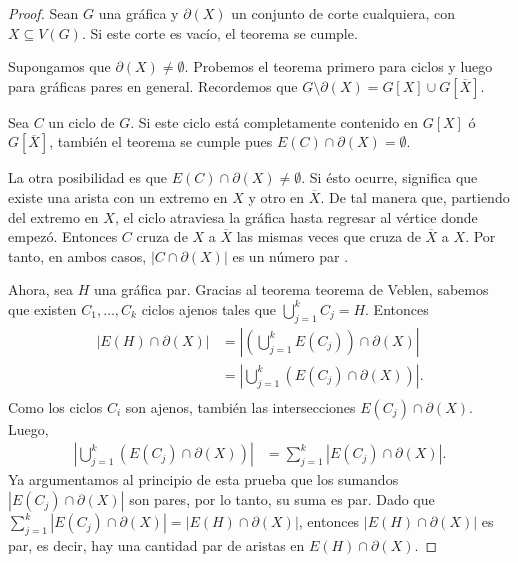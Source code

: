 \begin{proof} Sean $G$ una gráfica y $\partial(X)$ un conjunto de corte cualquiera, con $X \subseteq V(G)$. Si este corte es vacío, el teorema se cumple. 

Supongamos que $\partial(X) \neq \emptyset$. Probemos el teorema primero para ciclos y luego para gráficas pares en general. Recordemos que $G\setminus \partial(X) = G[X] \cup G[\overline{X}]$.

Sea $C$ un ciclo de $G$. Si este ciclo está completamente contenido en $G[X]$ ó $G[\overline{X}]$, también el teorema se cumple pues $E(C) \cap \partial(X) = \emptyset$.

La otra posibilidad es que $E(C) \cap \partial(X) \neq \emptyset$. Si ésto ocurre, significa que existe una arista con un extremo en $X$ y otro en $\overline{X}$. De tal manera que, partiendo del extremo en $X$, el ciclo atraviesa la gráfica hasta regresar al vértice donde empezó. Entonces $C$ cruza de $X$ a $\overline{X}$ las mismas veces que cruza de $\overline{X}$ a $X$. Por tanto, en ambos casos, $|C \cap \partial(X)|$ es un número par .

Ahora, sea $H$ una gráfica par. Gracias al teorema teorema de Veblen, sabemos que existen $C_{1},\ldots, C_{k}$ ciclos ajenos tales que $\bigcup_{j=1}^{k}C_{j} = H$. Entonces  
\begin{align*}
    |E(H) \cap \partial(X)| &= |(\bigcup_{j=1}^{k}E(C_{j})) \cap \partial(X)|\\
                      &= |\bigcup_{j=1}^{k} (E(C_{j}) \cap \partial(X))|.\\
\end{align*}
Como los ciclos $C_{i}$ son ajenos, también las intersecciones $E(C_{j}) \cap \partial(X)$. Luego, 
\begin{align*}
    |\bigcup_{j=1}^{k} (E(C_{j}) \cap \partial(X))| &= \sum_{j=1}^{k} |E(C_{j}) \cap \partial(X)|.
\end{align*}
Ya argumentamos al principio de esta prueba que los sumandos $|E(C_{j}) \cap \partial(X)|$ son pares, por lo tanto, su suma es par. Dado que $
    \sum_{j=1}^{k} |E(C_{j}) \cap \partial(X)| =  |E(H) \cap \partial(X)| $, entonces $ |E(H) \cap \partial(X)|$ es par, es decir, hay una cantidad par de aristas en $E(H) \cap \partial(X)$.
    
\end{proof}

